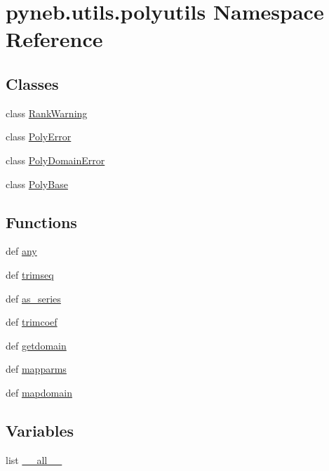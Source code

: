 \hypertarget{namespacepyneb_1_1utils_1_1polyutils}{\section{pyneb.\-utils.\-polyutils Namespace Reference}
\label{namespacepyneb_1_1utils_1_1polyutils}
}
\subsection*{Classes}
\begin{DoxyCompactItemize}
\item 
class \hyperlink{classpyneb_1_1utils_1_1polyutils_1_1_rank_warning}{Rank\-Warning}
\item 
class \hyperlink{classpyneb_1_1utils_1_1polyutils_1_1_poly_error}{Poly\-Error}
\item 
class \hyperlink{classpyneb_1_1utils_1_1polyutils_1_1_poly_domain_error}{Poly\-Domain\-Error}
\item 
class \hyperlink{classpyneb_1_1utils_1_1polyutils_1_1_poly_base}{Poly\-Base}
\end{DoxyCompactItemize}
\subsection*{Functions}
\begin{DoxyCompactItemize}
\item 
def \hyperlink{namespacepyneb_1_1utils_1_1polyutils_ae57e4cc7030d5459a7e7c1f61d7ed9a8}{any}
\item 
def \hyperlink{namespacepyneb_1_1utils_1_1polyutils_a973183162fdba436dae4946ec78c009b}{trimseq}
\item 
def \hyperlink{namespacepyneb_1_1utils_1_1polyutils_a9c3751d438f0f75922155c7823fe2699}{as\-\_\-series}
\item 
def \hyperlink{namespacepyneb_1_1utils_1_1polyutils_a505e3038cfd08b7f444ecca2234daa46}{trimcoef}
\item 
def \hyperlink{namespacepyneb_1_1utils_1_1polyutils_afbf8321a135ca2dc247215e16ea3399f}{getdomain}
\item 
def \hyperlink{namespacepyneb_1_1utils_1_1polyutils_a6d5e6ebb1be7c9077ec3ae28e803c83c}{mapparms}
\item 
def \hyperlink{namespacepyneb_1_1utils_1_1polyutils_ad7fe440bbe8d96e839de461f4db98cef}{mapdomain}
\end{DoxyCompactItemize}
\subsection*{Variables}
\begin{DoxyCompactItemize}
\item 
list \hyperlink{namespacepyneb_1_1utils_1_1polyutils_aa4a022e6ddacd362b83964da5cc5d044}{\-\_\-\-\_\-all\-\_\-\-\_\-}
\end{DoxyCompactItemize}


